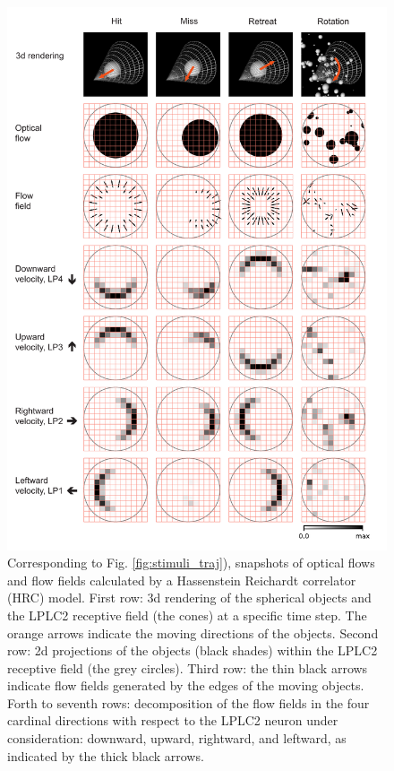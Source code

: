 \documentclass[pdftex,9pt,lineno]{elife}
\begin{document}
\begin{figure}
\includegraphics[width=\linewidth]{figures/stimuli_2_paper.pdf}
\caption{Corresponding to Fig. \ref{fig:stimuli_traj}), snapshots of optical flows and flow fields calculated by a Hassenstein Reichardt correlator (HRC) model. First row: 3d rendering of the spherical objects and the LPLC2 receptive field (the cones) at a specific time step. The orange arrows indicate the moving directions of the objects. Second row: 2d projections of the objects (black shades) within the LPLC2 receptive field (the grey circles). Third row: the thin black arrows indicate flow fields generated by the edges of the moving objects. Forth to seventh rows: decomposition of the flow fields in the four cardinal directions with respect to the LPLC2 neuron under consideration: downward, upward, rightward, and leftward, as indicated by the thick black arrows.}
\label{fig:stimuli_flow}

\end{figure}
\end{document}
